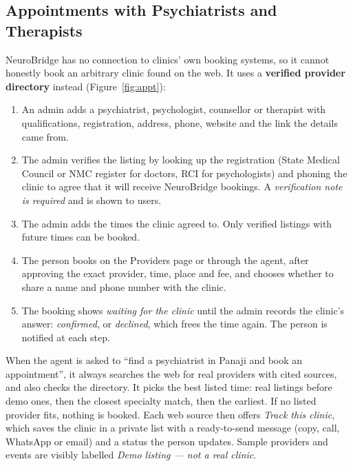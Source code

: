 \documentclass[11pt,a4paper]{article}
\begin{document}
\subsection{Appointments with Psychiatrists and Therapists}
NeuroBridge has no connection to clinics' own booking systems, so it cannot honestly book an arbitrary
clinic found on the web. It uses a \textbf{verified provider directory} instead (Figure~\ref{fig:appt}):
\begin{enumerate}
  \item An admin adds a psychiatrist, psychologist, counsellor or therapist with qualifications,
        registration, address, phone, website and the link the details came from.
  \item The admin verifies the listing by looking up the registration (State Medical Council or NMC
        register for doctors, RCI for psychologists) and phoning the clinic to agree that it will receive
        NeuroBridge bookings. A \emph{verification note is required} and is shown to users.
  \item The admin adds the times the clinic agreed to. Only verified listings with future times can be booked.
  \item The person books on the Providers page or through the agent, after approving the exact provider,
        time, place and fee, and chooses whether to share a name and phone number with the clinic.
  \item The booking shows \emph{waiting for the clinic} until the admin records the clinic's answer:
        \emph{confirmed}, or \emph{declined}, which frees the time again. The person is notified at each step.
\end{enumerate}
When the agent is asked to ``find a psychiatrist in Panaji and book an appointment'', it always searches the
web for real providers with cited sources, and also checks the directory. It picks the best listed time:
real listings before demo ones, then the closest specialty match, then the earliest. If no listed provider
fits, nothing is booked. Each web source then offers \emph{Track this clinic}, which saves the clinic in a
private list with a ready-to-send message (copy, call, WhatsApp or email) and a status the person updates.
Sample providers and events are visibly labelled \emph{Demo listing --- not a real clinic}.
\end{document}
